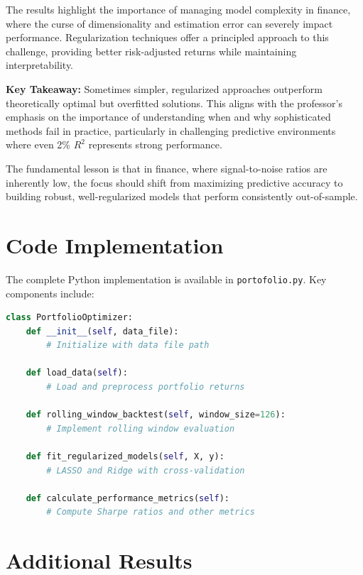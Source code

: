\documentclass[12pt]{article}
\begin{document}
The results highlight the importance of managing model complexity in finance, where the curse of dimensionality and estimation error can severely impact performance. Regularization techniques offer a principled approach to this challenge, providing better risk-adjusted returns while maintaining interpretability.

\textbf{Key Takeaway:} Sometimes simpler, regularized approaches outperform theoretically optimal but overfitted solutions. This aligns with the professor's emphasis on the importance of understanding when and why sophisticated methods fail in practice, particularly in challenging predictive environments where even 2\% $R^2$ represents strong performance.

The fundamental lesson is that in finance, where signal-to-noise ratios are inherently low, the focus should shift from maximizing predictive accuracy to building robust, well-regularized models that perform consistently out-of-sample.

\appendix

\section{Code Implementation}

The complete Python implementation is available in \texttt{portofolio.py}. Key components include:

\begin{lstlisting}[language=Python, caption=Portfolio Optimizer Class Structure]
class PortfolioOptimizer:
    def __init__(self, data_file):
        # Initialize with data file path
        
    def load_data(self):
        # Load and preprocess portfolio returns
        
    def rolling_window_backtest(self, window_size=126):
        # Implement rolling window evaluation
        
    def fit_regularized_models(self, X, y):
        # LASSO and Ridge with cross-validation
        
    def calculate_performance_metrics(self):
        # Compute Sharpe ratios and other metrics
\end{lstlisting}

\section{Additional Results}

\end{document}
